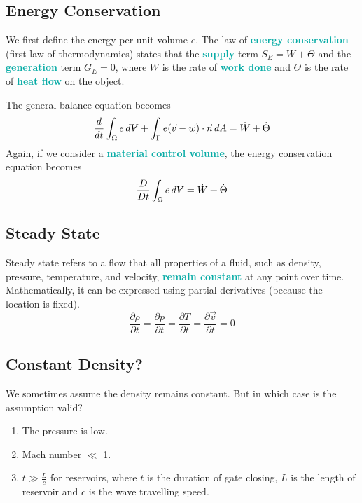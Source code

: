 \documentclass[twoside]{article}
\makeatletter
\DeclareRobustCommand{\vol}{\text{\volumedash}V}
\newcommand{\volumedash}{%
	\makebox[0pt][l]{%
		\ooalign{\hfil\hphantom{$\m@th V$}\hfil\cr\kern0.16em\rotatebox{27.5}{\textbf{--}}\hfil\cr}%
	}%
}
\newcommand{\highlightbluetext}[1]{\textcolor[HTML]{09ACA6}{\textbf{#1}}}
\numberwithin{equation}{section}
\makeatother
\begin{document}
	\subsection{Energy Conservation}
	\label{subsec:EnergyConservation}
	
	We first define the energy per unit volume $e$. The law of \highlightbluetext{energy conservation} (first law of thermodynamics) states that the \highlightbluetext{supply} term $\dot{S}_E = \dot{W}+\dot{\Theta}$ and the \highlightbluetext{generation} term $\dot{G}_E = 0$, where $\dot{W}$ is the rate of \highlightbluetext{work done} and $\dot{\Theta}$ is the rate of \highlightbluetext{heat flow} on the object.
	
	The general balance equation becomes
	\begin{equation}
		\frac{d}{dt} \int_\Omega e \, d\vol+\int_\Gamma e(\vec{v}-\vec{w}) \cdot \vec{n} \, dA = \dot{W}+\dot{\Theta}
		\label{eq:EnergyConservationIntegral}
	\end{equation}
	Again, if we consider a \highlightbluetext{material control volume}, the energy conservation equation becomes
	\begin{equation}
		\frac{D}{Dt} \int_\Omega e \, d\vol = \dot{W}+\dot{\Theta}
		\label{eq:MCVEnergyConservationIntegral}
	\end{equation}
	
	\subsection{Steady State}
	\label{subsec:SteadyState}
	
	Steady state refers to a flow that all properties of a fluid, such as density, pressure, temperature, and velocity, \highlightbluetext{remain constant} at any point over time. Mathematically, it can be expressed using partial derivatives (because the location is fixed).
	\begin{equation}
		\frac{\partial \rho}{\partial t} = \frac{\partial p}{\partial t} = \frac{\partial T}{\partial t} = \frac{\partial \vec{v}}{\partial t} = 0
		\label{SteadyStatePartialDerivatives}
	\end{equation}
	
	\subsection{Constant Density?}
	\label{ConstantDensity}
	
	We sometimes assume the density remains constant. But in which case is the assumption valid?
	\begin{enumerate}
		\item The pressure is low.
		\item Mach number $\ll$ 1.
		\item $t \gg \frac{L}{c}$ for reservoirs, where $t$ is the duration of gate closing, $L$ is the length of reservoir and $c$ is the wave travelling speed.
	\end{enumerate}
	
\end{document}
